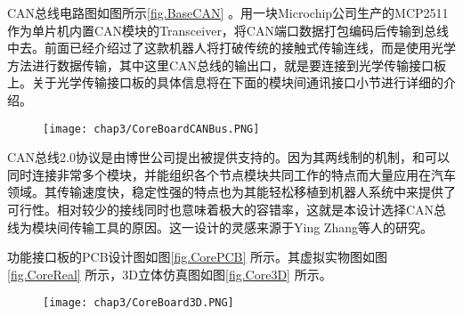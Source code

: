 CAN总线电路图如图所示\ref{fig.BaseCAN} 。用一块Microchip公司生产的MCP2511作为单片机内置CAN模块的Transceiver，将CAN端口数据打包编码后传输到总线中去。前面已经介绍过了这款机器人将打破传统的接触式传输连线，而是使用光学方法进行数据传输，其中这里CAN总线的输出口，就是要连接到光学传输接口板上。关于光学传输接口板的具体信息将在下面的模块间通讯接口小节进行详细的介绍。
\begin{figure}[!htp]
  \centering
  \texttt{[image: chap3/CoreBoardCANBus.PNG]}
\end{figure}


CAN总线2.0协议是由博世公司提出被提供支持的。因为其两线制的机制，和可以同时连接非常多个模块，并能组织各个节点模块共同工作的特点而大量应用在汽车领域。其传输速度快，稳定性强的特点也为其能轻松移植到机器人系统中来提供了可行性。相对较少的接线同时也意味着极大的容错率，这就是本设计选择CAN总线为模块间传输工具的原因。这一设计的灵感来源于Ying Zhang等人的研究。

功能接口板的PCB设计图如图\ref{fig.CorePCB} 所示。其虚拟实物图如图\ref{fig.CoreReal} 所示，3D立体仿真图如图\ref{fig.Core3D} 所示。 
\begin{figure}
  \centering
  \hspace{1in}
\end{figure}
\begin{figure}
  \centering
  \hspace{1in}
\end{figure}
\begin{figure}[!htp]
  \centering
  \texttt{[image: chap3/CoreBoard3D.PNG]}
\end{figure}
